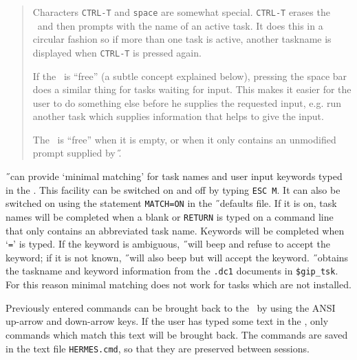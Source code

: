 \begin{quote}
\small
\parskip=0mm
Characters {\tt CTRL-T} and {\tt space} are somewhat special.
{\tt CTRL-T} erases the \UCA\ and then prompts with the name of an active task.
It does this in a circular fashion so if more than one task is active,
another taskname is displayed when {\tt CTRL-T} is pressed again.

If the \UCA\ is ``free'' (a subtle concept explained below), pressing the space
bar does a similar thing for tasks waiting for input. This makes it easier for
the user to do something else before he supplies the requested input, e.g.
run another task which supplies information that helps to give the input.

The \UCA\ is ``free'' when it is empty, or when it only contains an unmodified
prompt supplied by \H.
\end{quote}

\H\ can provide `minimal matching' for task names and user input keywords
typed in the \UCA.
This facility can be switched on and off by typing {\tt ESC M}.\label{escm}
It can also be switched on using the statement {\tt MATCH=ON} in the
\H\ defaults file.
If it is on, task names will be completed when a blank
or {\tt RETURN} is typed on a command line that only
contains an abbreviated task name.
Keywords will be completed when `{\tt =}' is
typed. If the keyword is ambiguous, \H\ will beep and refuse to accept the
keyword; if it is not known, \H\ will also beep but will accept the
keyword.\newline
\H\ obtains the taskname and
keyword information from the {\tt .dc1} documents in {\tt \$gip\_tsk}.
For this reason minimal matching does not work for tasks which are not
installed.

Previously entered commands can be brought back to the \UCA\ by using the
\label{uparrow}\label{downarrow} ANSI up-arrow and down-arrow keys.
If the user has typed some text in the
\UCA, only commands which match this text will be brought back.
The commands are saved in the text file {\tt HERMES.cmd}, so that they
are preserved between sessions.

